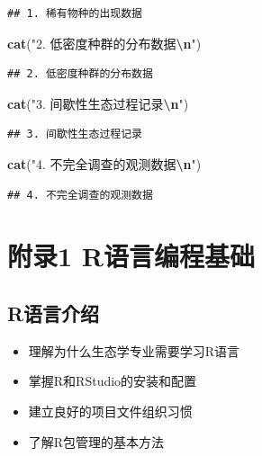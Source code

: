 \documentclass[
  twoside]{book}
\newenvironment{Shaded}{\begin{snugshade}}{\end{snugshade}}
\newcommand{\FunctionTok}[1]{\textcolor[rgb]{0.13,0.29,0.53}{\textbf{#1}}}
\newcommand{\NormalTok}[1]{#1}
\newcommand{\SpecialCharTok}[1]{\textcolor[rgb]{0.81,0.36,0.00}{\textbf{#1}}}
\newcommand{\StringTok}[1]{\textcolor[rgb]{0.31,0.60,0.02}{#1}}
\providecommand{\tightlist}{%
  \setlength{\itemsep}{0pt}\setlength{\parskip}{0pt}}
\begin{document}
\begin{verbatim}
## 1. 稀有物种的出现数据
\end{verbatim}

\begin{Shaded}
\begin{Highlighting}[]
\FunctionTok{cat}\NormalTok{(}\StringTok{"2. 低密度种群的分布数据}\SpecialCharTok{\textbackslash{}n}\StringTok{"}\NormalTok{)}
\end{Highlighting}
\end{Shaded}

\begin{verbatim}
## 2. 低密度种群的分布数据
\end{verbatim}

\begin{Shaded}
\begin{Highlighting}[]
\FunctionTok{cat}\NormalTok{(}\StringTok{"3. 间歇性生态过程记录}\SpecialCharTok{\textbackslash{}n}\StringTok{"}\NormalTok{)}
\end{Highlighting}
\end{Shaded}

\begin{verbatim}
## 3. 间歇性生态过程记录
\end{verbatim}

\begin{Shaded}
\begin{Highlighting}[]
\FunctionTok{cat}\NormalTok{(}\StringTok{"4. 不完全调查的观测数据}\SpecialCharTok{\textbackslash{}n}\StringTok{"}\NormalTok{)}
\end{Highlighting}
\end{Shaded}

\begin{verbatim}
## 4. 不完全调查的观测数据
\end{verbatim}

\hypertarget{ux9644ux5f551-rux8bedux8a00ux7f16ux7a0bux57faux7840}{%
\chapter{附录1 R语言编程基础}\label{ux9644ux5f551-rux8bedux8a00ux7f16ux7a0bux57faux7840}}

\hypertarget{rux8bedux8a00ux4ecbux7ecd}{%
\section{R语言介绍}\label{rux8bedux8a00ux4ecbux7ecd}}

\begin{itemize}
\tightlist
\item
  理解为什么生态学专业需要学习R语言
\item
  掌握R和RStudio的安装和配置
\item
  建立良好的项目文件组织习惯
\item
  了解R包管理的基本方法
\end{itemize}
\end{document}
